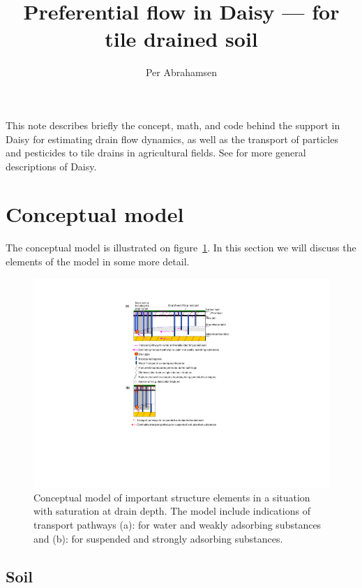 \documentclass[a4paper]{article}
\begin{document}
\title{Preferential flow in Daisy --- for tile drained soil}
\author{Per Abrahamsen}

\maketitle

This note describes briefly the concept, math, and code behind the
support in Daisy for estimating drain flow dynamics, as well as the
transport of particles and pesticides to tile drains in agricultural
fields.  See \citet{daisy-def,daisy-ems,daisy-new,daisyN} for more
general descriptions of Daisy.

\section{Conceptual model}

The conceptual model is illustrated on figure~\ref{fig:concept}.  In
this section we will discuss the elements of the model in some more
detail.

\begin{figure}[htbp]
  \includegraphics[trim=9cm 6cm 10cm 2cm,clip=true,width=\textwidth]{r2d2-concept}
  \caption{Conceptual model of important structure elements in a
    situation with saturation at drain depth. The model include
    indications of transport pathways (a): for water and weakly
    adsorbing substances and (b): for suspended and strongly adsorbing
    substances.}
  \label{fig:concept}
\end{figure}

\subsection{Soil}
\end{document}

